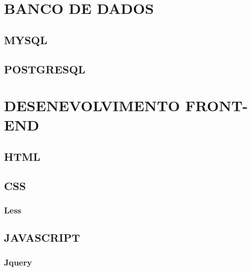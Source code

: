 \documentclass[12pt,floatnumber=continuous,espaco=umemeio]{abnt}
\begin{document}
 
	
	\capa 
	\folhaderosto 
	
	
  
	
	\indices

	
	
	
	
	
	
	
	\newpage
	
	\chapter{BANCO DE DADOS}
	\section{MYSQL}
	\section{POSTGRESQL}
	
	\chapter{DESENEVOLVIMENTO FRONT-END}
	\section{HTML}
	\section{CSS}
	\subsection{Less}
	\section{JAVASCRIPT}
	\subsection{Jquery}
\end{document}
